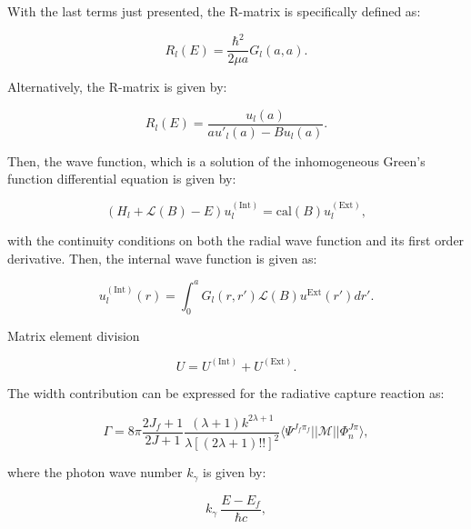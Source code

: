 \documentclass[openany]{book}
\begin{document}
With the last terms just presented, the R-matrix is specifically defined as: 

\begin{equation}\label{rmatrix_Bloch_rmatrix}
	R_l(E) = \frac{\hbar^2}{2\mu a} G_l(a, a).
\end{equation} 

Alternatively, the R-matrix is given by:

\begin{equation}\label{rmatrix_u_rmatrix}
	R_l(E) =  \frac{u_l(a)}{au'_{l}(a) - Bu_l(a)}.
\end{equation} 

Then, the wave function, which is a solution of the inhomogeneous Green's function differential equation is given by:

\begin{equation}\label{rmatrix_BlochSchrodinger_inhomogeneous}
	(H_l + \mathcal{L}(B) - E)u^{\mathrm{(Int)}}_l = \mathrm{cal}(B) u^{\mathrm{(Ext)}}_l ,
\end{equation}

with the continuity conditions on both the radial wave function and its first order derivative. Then, the internal wave function is given as:

\begin{equation}\label{rmatrix_Bloch_internalWaveFunction}
	u^{(\mathrm{Int})}_l(r) = \int_{0}^{a} G_l(r, r') \mathcal{L}(B) u^{\mathrm{Ext}} (r') dr'.
\end{equation} 

Matrix element division

\begin{equation}\label{rmatrix_scatteringMatrix_division}
	U = U^{\mathrm{(Int)}} + U^{\mathrm{(Ext)}}.
\end{equation} 

The width contribution can be expressed for the radiative capture reaction as: 

\begin{equation}\label{rmatrix_radiativeCapture_width}
	\Gamma = 8\pi \frac{2J_f + 1}{2J + 1} \frac{(\lambda + 1)k^{2\lambda + 1}}{\lambda [(2\lambda + 1)!!]^2}  \langle \Psi^{J_f \pi_f} || \mathcal{M} || \Phi^{J\pi}_n \rangle,
\end{equation}

where the photon wave number $k_\gamma$ is given by:

\begin{equation}\label{rmatrix_radiativeCapture_waveNumberPhoton}
	k_\gamma \ \frac{E- E_f}{\hbar c},
\end{equation}
\end{document}
